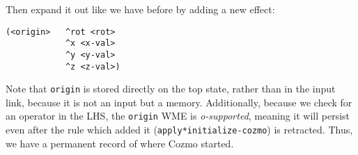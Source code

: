Then expand it out like we have before by adding a new effect:

\begin{verbatim}
(<origin>   ^rot <rot>
            ^x <x-val>
            ^y <y-val>
            ^z <z-val>)
\end{verbatim}

Note that \texttt{origin} is stored directly on the top state, rather
than in the input link, because it is not an input but a memory.
Additionally, because we check for an operator in the LHS, the
\texttt{origin} WME is \emph{o-supported}, meaning it will persist even
after the rule which added it (\texttt{apply*initialize-cozmo}) is
retracted. Thus, we have a permanent record of where Cozmo started.
